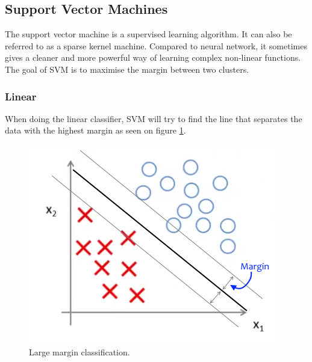 
\subsection{Support Vector Machines}
The support vector machine is a supervised learning algorithm. It can also be referred to as a sparse kernel machine. 
Compared to neural network, it sometimes gives a cleaner and more powerful way of learning complex non-linear functions. 
The goal of SVM is to maximise the margin between two clusters.

\subsubsection{Linear}
When doing the linear classifier, SVM will try to find the line that separates the data with the highest margin as seen on figure \ref{fig:svm-margin}.

\begin{figure}[H]
\centering
\includegraphics[scale=.75]{billeder/svm-margin}
\caption{Large margin classification.}
\label{fig:svm-margin}
\end{figure}

